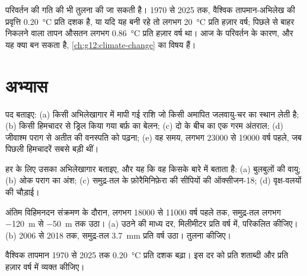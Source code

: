 परिवर्तन की गति की भी तुलना की जा सकती है। 1970 से 2025 तक,
वैश्विक तापमान-अभिलेख की प्रवृत्ति \qty{0.20}{\degreeCelsius} प्रति दशक है, या
यदि यह बनी रहे तो लगभग \qty{20}{\degreeCelsius} प्रति हज़ार वर्ष; पिछले
 से बाहर निकलने वाला तापन औसतन लगभग
\qty{0.86}{\degreeCelsius} प्रति हज़ार वर्ष था। आज के परिवर्तन के कारण,
और यह क्या बन सकता है, \cref{ch:g12:climate-change} का विषय हैं।

\section{अभ्यास}

\begin{exercise}[$\star$]\label{exo:g12:past-climates:1}
पद बताइए: (a) किसी अभिलेखागार में मापी गई राशि जो किसी अमापित
जलवायु-चर का स्थान लेती है; (b) किसी हिमचादर से ड्रिल किया गया बर्फ़ का बेलन;
(c) दो  के बीच का एक गरम अंतराल; (d) जीवाश्म पराग से अतीत की
वनस्पति को पढ़ना; (e) वह समय, लगभग \num{23000} से \num{19000}
वर्ष पहले, जब पिछली हिमचादरें सबसे बड़ी थीं।
\end{exercise}

\begin{exercise}[$\star$]\label{exo:g12:past-climates:2}
हर  के लिए उसका अभिलेखागार बताइए, और यह कि वह किसके बारे में बताता है: (a) बुलबुलों
की वायु; (b) ओक पराग का अंश; (c) समुद्र-तल के फ़ोरैमिनिफ़ेरा की सीपियों की
ऑक्सीजन-18; (d) वृक्ष-वलयों की चौड़ाई।
\end{exercise}

\begin{exercise}[$\star$]\label{exo:g12:past-climates:3}
अंतिम विहिमनदन संक्रमण के दौरान, लगभग \num{18000} से \num{11000}
वर्ष पहले तक, समुद्र-तल लगभग \qty{-120}{m} से \qty{-50}{m} तक उठा। (a)
उठने की माध्य दर, मिलीमीटर प्रति वर्ष में, परिकलित कीजिए। (b) 2006 से 2018 तक, समुद्र-तल
\qty{3.7}{mm} प्रति वर्ष उठा। तुलना कीजिए।
\end{exercise}

\begin{exercise}[$\star$]\label{exo:g12:past-climates:4}
वैश्विक तापमान 1970 से 2025 तक \qty{0.20}{\degreeCelsius} प्रति दशक
बढ़ा। इस दर को प्रति शताब्दी और प्रति हज़ार वर्ष में व्यक्त कीजिए।
\end{exercise}

